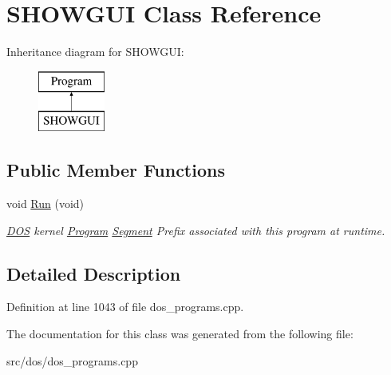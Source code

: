 \hypertarget{classSHOWGUI}{\section{S\-H\-O\-W\-G\-U\-I Class Reference}
\label{classSHOWGUI}
}
Inheritance diagram for S\-H\-O\-W\-G\-U\-I\-:\begin{figure}[H]
\begin{center}
\leavevmode
\includegraphics[height=2.000000cm]{classSHOWGUI}
\end{center}
\end{figure}
\subsection*{Public Member Functions}
\begin{DoxyCompactItemize}
\item 
\hypertarget{classSHOWGUI_a6aa41914fca5264f9c63856c9578dd29}{void \hyperlink{classSHOWGUI_a6aa41914fca5264f9c63856c9578dd29}{Run} (void)}\label{classSHOWGUI_a6aa41914fca5264f9c63856c9578dd29}

\begin{DoxyCompactList}\small\item\em \hyperlink{classDOS}{D\-O\-S} kernel \hyperlink{classProgram}{Program} \hyperlink{structSegment}{Segment} Prefix associated with this program at runtime. \end{DoxyCompactList}\end{DoxyCompactItemize}


\subsection{Detailed Description}


Definition at line 1043 of file dos\-\_\-programs.\-cpp.



The documentation for this class was generated from the following file\-:\begin{DoxyCompactItemize}
\item 
src/dos/dos\-\_\-programs.\-cpp\end{DoxyCompactItemize}
